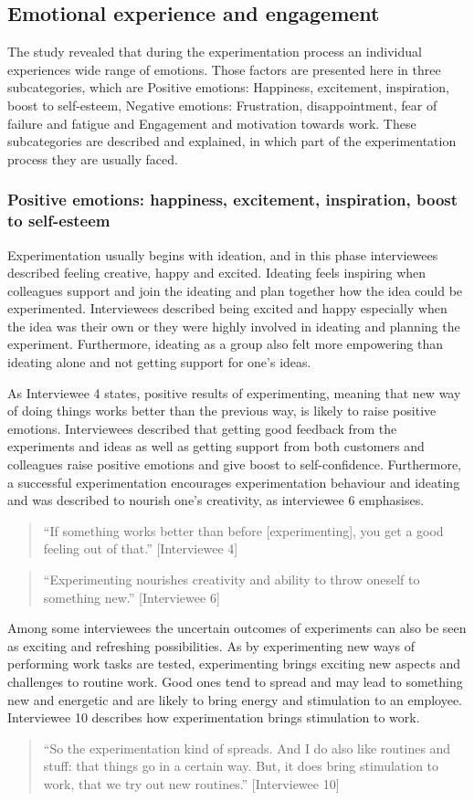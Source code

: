 \subsection{Emotional experience and engagement}
The study revealed that during the experimentation process an individual experiences wide range of emotions. Those factors are presented here in three subcategories, which are Positive emotions: Happiness, excitement, inspiration, boost to self-esteem, Negative emotions: Frustration, disappointment, fear of failure and fatigue and Engagement and motivation towards work. These subcategories are described and explained, in which part of the experimentation process they are usually faced. 

\subsubsection{Positive emotions: happiness, excitement, inspiration, boost to self-esteem}
Experimentation usually begins with ideation, and in this phase interviewees described feeling creative, happy and excited. Ideating feels inspiring when colleagues support and join the ideating and plan together how the idea could be experimented. Interviewees described being excited and happy especially when the idea was their own or they were highly involved in ideating and planning the experiment.  Furthermore, ideating as a group also felt more empowering than ideating alone and not getting support for one's ideas. 

As Interviewee 4 states, positive results of experimenting, meaning that new way of doing things works better than the previous way, is likely to raise positive emotions. Interviewees described that getting good feedback from the experiments and ideas as well as getting support from both customers and colleagues raise positive emotions and give boost to self-confidence. Furthermore, a successful experimentation encourages experimentation behaviour and ideating and was described to nourish one's creativity, as interviewee 6 emphasises.  
\begin{quote}
``If something works better than before [experimenting], you get a good feeling out of that.'' [Interviewee 4]
\end{quote}
\begin{quote}
``Experimenting nourishes creativity and ability to throw oneself to something new.'' [Interviewee 6]
\end{quote}
Among some interviewees the uncertain outcomes of experiments can also be seen as exciting and refreshing possibilities. As by experimenting new ways of performing work tasks are tested, experimenting brings exciting new aspects and challenges to routine work. Good ones tend to spread and may lead to something new and energetic and are likely to bring energy and stimulation to an employee. Interviewee 10 describes how experimentation brings stimulation to work. 
\begin{quote}
``So the experimentation kind of spreads. And I do also like routines and stuff: that things go in a certain way. But, it does bring stimulation to work, that we try out new routines.'' [Interviewee 10]
\end{quote}

